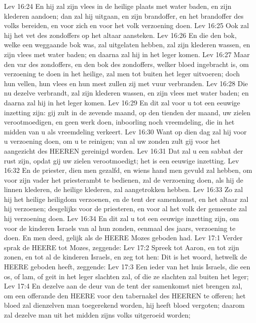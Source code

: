 Lev 16:24  En hij zal zijn vlees in de heilige plaats met water baden, en zijn klederen aandoen; dan zal hij uitgaan, en zijn brandoffer, en het brandoffer des volks bereiden, en voor zich en voor het volk verzoening doen.
Lev 16:25  Ook zal hij het vet des zondoffers op het altaar aansteken.
Lev 16:26  En die den bok, welke een weggaande bok was, zal uitgelaten hebben, zal zijn klederen wassen, en zijn vlees met water baden; en daarna zal hij in het leger komen.
Lev 16:27  Maar den var des zondoffers, en den bok des zondoffers, welker bloed ingebracht is, om verzoening te doen in het heilige, zal men tot buiten het leger uitvoeren; doch hun vellen, hun vlees en hun mest zullen zij met vuur verbranden.
Lev 16:28  Die nu dezelve verbrandt, zal zijn klederen wassen, en zijn vlees met water baden; en daarna zal hij in het leger komen.
Lev 16:29  En dit zal voor u tot een eeuwige inzetting zijn: gij zult in de zevende maand, op den tienden der maand, uw zielen verootmoedigen, en geen werk doen, inboorling noch vreemdeling, die in het midden van u als vreemdeling verkeert.
Lev 16:30  Want op dien dag zal hij voor u verzoening doen, om u te reinigen; van al uw zonden zult gij voor het aangezicht des HEEREN gereinigd worden.
Lev 16:31  Dat zal u een sabbat der rust zijn, opdat gij uw zielen verootmoedigt; het is een eeuwige inzetting.
Lev 16:32  En de priester, dien men gezalfd, en wiens hand men gevuld zal hebben, om voor zijn vader het priesterambt te bedienen, zal de verzoening doen, als hij de linnen klederen, de heilige klederen, zal aangetrokken hebben.
Lev 16:33  Zo zal hij het heilige heiligdom verzoenen, en de tent der samenkomst, en het altaar zal hij verzoenen; desgelijks voor de priesteren, en voor al het volk der gemeente zal hij verzoening doen.
Lev 16:34  En dit zal u tot een eeuwige inzetting zijn, om voor de kinderen Israels van al hun zonden, eenmaal des jaars, verzoening te doen. En men deed, gelijk als de HEERE Mozes geboden had.
Lev 17:1  Verder sprak de HEERE tot Mozes, zeggende:
Lev 17:2  Spreek tot Aaron, en tot zijn zonen, en tot al de kinderen Israels, en zeg tot hen: Dit is het woord, hetwelk de HEERE geboden heeft, zeggende:
Lev 17:3  Een ieder van het huis Israels, die een os, of lam, of geit in het leger slachten zal, of die ze slachten zal buiten het leger;
Lev 17:4  En dezelve aan de deur van de tent der samenkomst niet brengen zal, om een offerande den HEERE voor den tabernakel des HEEREN te offeren; het bloed zal dienzelven man toegerekend worden, hij heeft bloed vergoten; daarom zal dezelve man uit het midden zijns volks uitgeroeid worden;

